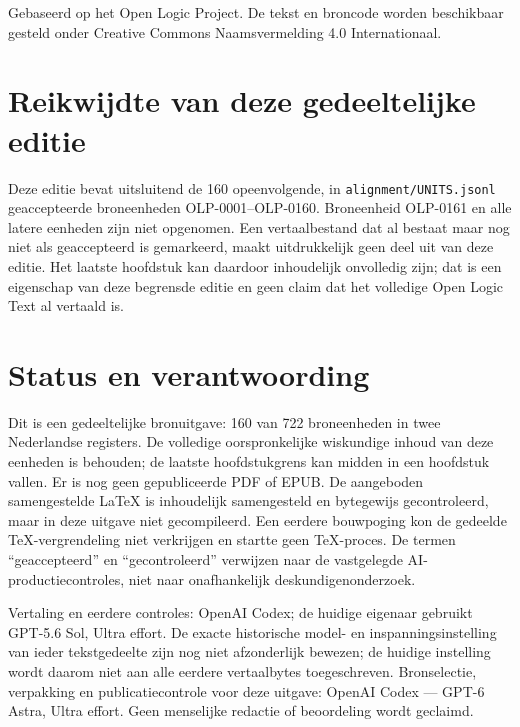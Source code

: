 \documentclass[openany]{memoir}
\begin{document}
\begin{titlingpage}
\vfill
\noindent Gebaseerd op het Open Logic Project. De tekst en broncode worden
beschikbaar gesteld onder Creative Commons Naamsvermelding 4.0 Internationaal.
\end{titlingpage}
\chapter*{Reikwijdte van deze gedeeltelijke editie}
Deze editie bevat uitsluitend de 160 opeenvolgende,
in \texttt{alignment/UNITS.jsonl} geaccepteerde broneenheden OLP-0001--OLP-0160.
Broneenheid OLP-0161 en alle latere eenheden zijn niet opgenomen.
Een vertaalbestand dat al bestaat maar nog niet als geaccepteerd is gemarkeerd,
maakt uitdrukkelijk geen deel uit van deze editie. Het laatste hoofdstuk kan
daardoor inhoudelijk onvolledig zijn; dat is een eigenschap van deze begrensde
editie en geen claim dat het volledige Open Logic Text al vertaald is.
\chapter*{Status en verantwoording}
Dit is een gedeeltelijke bronuitgave: 160 van 722 broneenheden in twee Nederlandse registers. De volledige oorspronkelijke wiskundige inhoud van deze eenheden is behouden; de laatste hoofdstukgrens kan midden in een hoofdstuk vallen. Er is nog geen gepubliceerde PDF of EPUB. De aangeboden samengestelde LaTeX is inhoudelijk samengesteld en bytegewijs gecontroleerd, maar in deze uitgave niet gecompileerd. Een eerdere bouwpoging kon de gedeelde TeX-vergrendeling niet verkrijgen en startte geen TeX-proces. De termen “geaccepteerd” en “gecontroleerd” verwijzen naar de vastgelegde AI-productiecontroles, niet naar onafhankelijk deskundigenonderzoek.

Vertaling en eerdere controles: OpenAI Codex; de huidige eigenaar gebruikt GPT-5.6 Sol, Ultra effort. De exacte historische model- en inspanningsinstelling van ieder tekstgedeelte zijn nog niet afzonderlijk bewezen; de huidige instelling wordt daarom niet aan alle eerdere vertaalbytes toegeschreven. Bronselectie, verpakking en publicatiecontrole voor deze uitgave: OpenAI Codex — GPT-6 Astra, Ultra effort. Geen menselijke redactie of beoordeling wordt geclaimd.
\tableofcontents*
\end{document}
